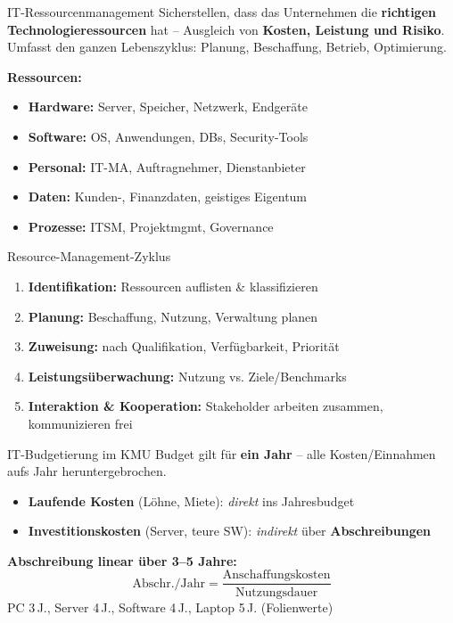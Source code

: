 \documentclass[a4paper, fontsize=7pt]{scrartcl}
\begin{document}
\begin{mainbox}{IT-Ressourcenmanagement}
Sicherstellen, dass das Unternehmen die \textbf{richtigen
Technologieressourcen} hat -- Ausgleich von \textbf{Kosten, Leistung und
Risiko}. Umfasst den ganzen Lebenszyklus: Planung, Beschaffung, Betrieb,
Optimierung.

\textbf{Ressourcen:}
\begin{itemize}
    \item \textbf{Hardware:} Server, Speicher, Netzwerk, Endgeräte
    \item \textbf{Software:} OS, Anwendungen, DBs, Security-Tools
    \item \textbf{Personal:} IT-MA, Auftragnehmer, Dienstanbieter
    \item \textbf{Daten:} Kunden-, Finanzdaten, geistiges Eigentum
    \item \textbf{Prozesse:} ITSM, Projektmgmt, Governance
\end{itemize}
\end{mainbox}

\begin{mainbox}{Resource-Management-Zyklus}
\begin{enumerate}
    \item \textbf{Identifikation:} Ressourcen auflisten \& klassifizieren
    \item \textbf{Planung:} Beschaffung, Nutzung, Verwaltung planen
    \item \textbf{Zuweisung:} nach Qualifikation, Verfügbarkeit, Priorität
    \item \textbf{Leistungsüberwachung:} Nutzung vs. Ziele/Benchmarks
    \item \textbf{Interaktion \& Kooperation:} Stakeholder arbeiten zusammen,
          kommunizieren frei
\end{enumerate}
\end{mainbox}

\begin{mainbox}{IT-Budgetierung im KMU}
Budget gilt für \textbf{ein Jahr} -- alle Kosten/Einnahmen aufs Jahr
heruntergebrochen.
\begin{itemize}
    \item \textbf{Laufende Kosten} (Löhne, Miete): \emph{direkt} ins
          Jahresbudget
    \item \textbf{Investitionskosten} (Server, teure SW): \emph{indirekt}
          über \textbf{Abschreibungen}
\end{itemize}
\textbf{Abschreibung linear über 3--5 Jahre:}
$$\boxed{\text{Abschr./Jahr} = \frac{\text{Anschaffungskosten}}{\text{Nutzungsdauer}}}$$
PC 3\,J., Server 4\,J., Software 4\,J., Laptop 5\,J. (Folienwerte)
\end{mainbox}
\end{document}

